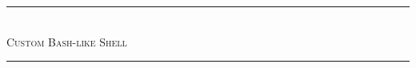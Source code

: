 \documentclass{article}
\begin{document}
\begin{center}
\rule{400pt}{1pt}\\
[3mm]
\textsc{\LARGE Custom Bash-like Shell}\\
\rule{400pt}{1pt}
\end{center}

\author{Parth Kalgaonkar}
\end{document}
